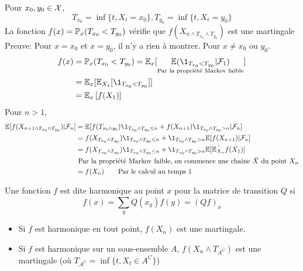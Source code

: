\documentclass[]{report}
\begin{document}
    \begin{ex}{}{}
        Pour $x_0,y_0\in \mathcal{X}$,
        \[T_{x_0}=\inf\{t,X_t=x_0\},T_{y_0}=\inf\{t,X_t=y_0\}\]
        La fonction $f(x)=\mathbb{P}_x(T_{x_0}<T_{y_0})$ vérifie que $f(X_{n\wedge T_{x_0}\wedge T_{y_0}})$ est une martingale\\
        Preuve: Pour $x=x_0$ et $x=y_0$, il n'y a rien à montrer. Pour $x\neq x_0$ ou $y_0$.
        \begin{align*}
            f(x)&=\Pa_x(T_{x_0}<T_{y_0})=\Ea_x[\underset{\text{Par la propriété Markov faible}}{\Ea(\1_{T_{x_0}<T_{y_0}}|\Fr_1)}]\\
            &=\Ea_x[\Ea_{X_1}[\1_{T_{x_0}<T_{y_0}}]]\\
            &=\Ea_x\left[ f(X_1)\right]
        \end{align*}
        Pour $n>1$,
        \begin{align*}
            \Ea[f(X_{n+1\wedge T_{x_0}\wedge T_{y_0}})|\Fr_n]&=\Ea[f(T_{x_0\wedge y_0})\1_{T_{x_0}\wedge T_{y_0}\le n}+ f(X_{n+1})\1_{T_{x_0}\wedge T_{y_0}>n}|\Fr_n]\\
            &=f(X_{T_{x_0}\wedge T_{y_0}})\1_{T_{x_0}\wedge T_{y_0}\le n}+\1_{T_{x_0}\wedge T_{y_0}>n}\Ea[f(X_{n+1})|\Fr_n]\\
            &=f(X_{T_{x_0}\wedge T_{y_0}})\1_{T_{x_0}\wedge T_{y_0}\le n}+\1_{T_{x_0}\wedge T_{y_0}>n}\Ea[\tilde{\Ea_{X_n}}f(\tilde{X_1})]\\
            &\text{ Par la propriété Markov faible, on commence une chaîne $\tilde{X}$ du point $X_n$}\\
            &=f(X_n)\qquad \text{Par le calcul au temps $1$}
        \end{align*}
    \end{ex}

    \begin{df}{}{}
        Une fonction $f $ est dite harmonique au point $x$ pour la matrice de transition $Q$ si
        \[f(x)=\sum_y Q(x_y)f(y)=(Qf)_x\]
    \end{df}

    \begin{prop}{}{}
        \begin{itemize}
            \item Si $f$ est harmonique en tout point, $f(X_n)$ est une martingale.
            \item Si $f$ est harmonique sur un sous-ensemble $A$, $f(X_n\wedge T_{A^C})$ est une martingale (où $T_{A^C}=\inf \{t,X_t\in A^C\}$)
        \end{itemize}
    \end{prop}
\end{document}
